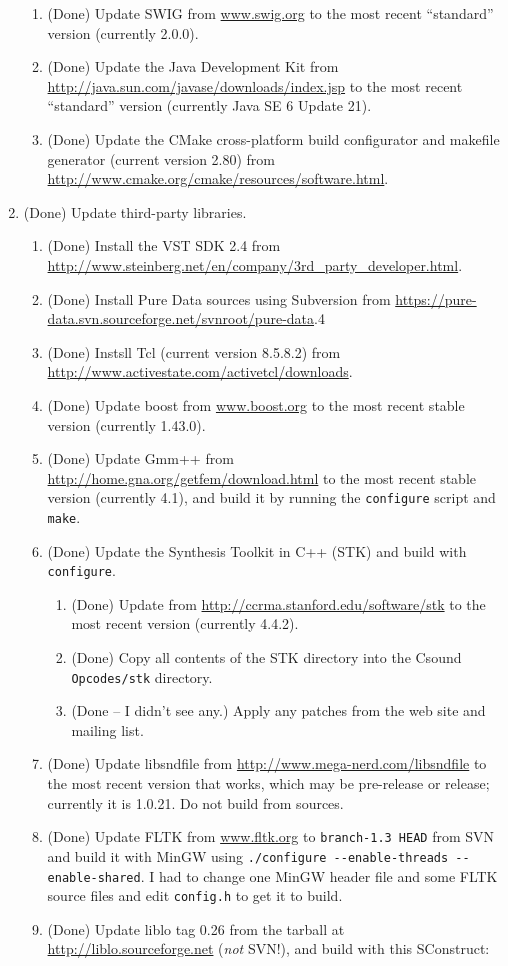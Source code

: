 \documentclass[11pt,letterpaper,onecolumn]{scrartcl}
\begin{document}
\begin{sloppypar}
\begin{enumerate}
\begin{enumerate}
	    \item (Done) Update SWIG from \url{www.swig.org} to the most recent ``standard'' version (currently 2.0.0).
	    \item (Done) Update the Java Development Kit from \url{http://java.sun.com/javase/downloads/index.jsp} to the most recent ``standard'' version (currently Java SE 6 Update 21).
	    \item (Done) Update the CMake cross-platform build configurator and makefile generator (current version 2.80) from \url{http://www.cmake.org/cmake/resources/software.html}.
		\end{enumerate}    
	\item (Done) Update third-party libraries.   
		\begin{enumerate}
    	\item (Done) Install the VST SDK 2.4 from \url{http://www.steinberg.net/en/company/3rd_party_developer.html}.
    	\item (Done) Install Pure Data sources using Subversion from \url{https://pure-data.svn.sourceforge.net/svnroot/pure-data}.4
    	\item (Done) Instsll Tcl (current version 8.5.8.2) from \url{http://www.activestate.com/activetcl/downloads}.
   		\item (Done) Update boost from \url{www.boost.org} to the most recent stable version (currently 1.43.0).
  		\item (Done) Update Gmm++ from \url{http://home.gna.org/getfem/download.html} to the most recent stable version (currently 4.1), and build it by running the \texttt{configure} script and \texttt{make}.
    	\item (Done) Update the Synthesis Toolkit in C++ (STK) and build with \texttt{configure}.
				\begin{enumerate}
					\item (Done) Update from \url{http://ccrma.stanford.edu/software/stk} to the most recent version (currently 4.4.2). 
					\item (Done) Copy all contents of the STK directory into the Csound \texttt{Opcodes/stk} directory.
					\item (Done -- I didn't see any.) Apply any patches from the web site and mailing list. 
				\end{enumerate}   	
			\item (Done) Update libsndfile from \url{http://www.mega-nerd.com/libsndfile} to the most recent version that works, which may be pre-release or release; currently it is 1.0.21. Do not build from sources. 
    	\item (Done) Update FLTK from \url{www.fltk.org} to \texttt{branch-1.3 HEAD} from SVN and build it with MinGW using \verb|./configure --enable-threads --enable-shared|. I had to change one MinGW header file and some FLTK source files and edit \texttt{config.h} to get it to build.
     	\item (Done) Update liblo tag 0.26 from the tarball at \url{http://liblo.sourceforge.net} (\emph{not} SVN!), and build with this SConstruct:
    	

\end{enumerate}
\end{enumerate}
\end{sloppypar}
\end{document}
